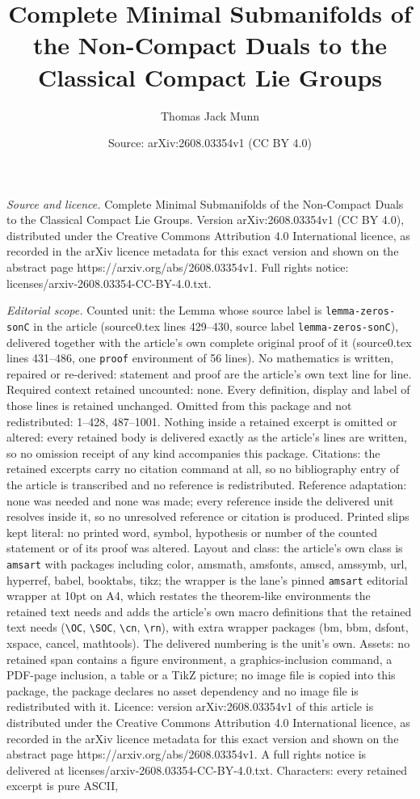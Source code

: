 \documentclass[10pt,a4paper]{amsart}
\title[Complete Minimal Submanifolds of the Non-Compact Duals to th]{Complete Minimal Submanifolds of the Non-Compact Duals to the Classical Compact Lie Groups}
\author{Thomas Jack Munn}
\date{Source: arXiv:2608.03354v1 (CC BY 4.0)}
\begin{document}
\maketitle

\noindent\emph{Source and licence.} Complete Minimal Submanifolds of the Non-Compact Duals to the Classical Compact Lie Groups. Version arXiv:2608.03354v1 (CC BY 4.0), distributed under the Creative Commons Attribution 4.0 International licence, as recorded in the arXiv licence metadata for this exact version and shown on the abstract page https://arxiv.org/abs/2608.03354v1. Full rights notice: licenses/arxiv-2608.03354-CC-BY-4.0.txt.\par\smallskip

\noindent\textit{Editorial scope.} Counted unit: the Lemma whose source label is \texttt{lemma-zeros-sonC} in the article (source0.tex lines 429--430, source label \texttt{lemma-zeros-sonC}), delivered together with the article's own complete original proof of it (source0.tex lines 431--486, one \texttt{proof} environment of 56 lines). No mathematics is written, repaired or re-derived: statement and proof are the article's own text line for line. Required context retained uncounted: none. Every definition, display and label of those lines is retained unchanged. Omitted from this package and not redistributed: 1--428, 487--1001. Nothing inside a retained excerpt is omitted or altered: every retained body is delivered exactly as the article's lines are written, so no omission receipt of any kind accompanies this package. Citations: the retained excerpts carry no citation command at all, so no bibliography entry of the article is transcribed and no reference is redistributed. Reference adaptation: none was needed and none was made; every reference inside the delivered unit resolves inside it, so no unresolved reference or citation is produced. Printed slips kept literal: no printed word, symbol, hypothesis or number of the counted statement or of its proof was altered. Layout and class: the article's own class is \texttt{amsart} with packages including color, amsmath, amsfonts, amscd, amssymb, url, hyperref, babel, booktabs, tikz; the wrapper is the lane's pinned \texttt{amsart} editorial wrapper at 10pt on A4, which restates the theorem-like environments the retained text needs and adds the article's own macro definitions that the retained text needs (\texttt{\textbackslash OC}, \texttt{\textbackslash SOC}, \texttt{\textbackslash cn}, \texttt{\textbackslash rn}), with extra wrapper packages (bm, bbm, dsfont, xspace, cancel, mathtools). The delivered numbering is the unit's own. Assets: no retained span contains a figure environment, a graphics-inclusion command, a PDF-page inclusion, a table or a TikZ picture; no image file is copied into this package, the package declares no asset dependency and no image file is redistributed with it. Licence: version arXiv:2608.03354v1 of this article is distributed under the Creative Commons Attribution 4.0 International licence, as recorded in the arXiv licence metadata for this exact version and shown on the abstract page https://arxiv.org/abs/2608.03354v1. A full rights notice is delivered at licenses/arxiv-2608.03354-CC-BY-4.0.txt. Characters: every retained excerpt is pure ASCII, 
\end{document}
